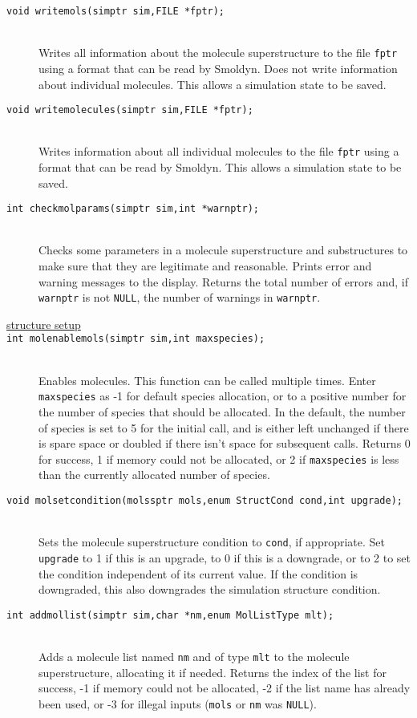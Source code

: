 \documentclass {scrbook}
\newcommand {\ttt} {\texttt}
\begin{document}
\begin{description}
\item[\ttt{void writemols(simptr sim,FILE *fptr);}]
\hfill \\
Writes all information about the molecule superstructure to the file \ttt{fptr} using a format that can be read by Smoldyn. Does not write information about individual molecules. This allows a simulation state to be saved.

\item[\ttt{void writemolecules(simptr sim,FILE *fptr);}]
\hfill \\
Writes information about all individual molecules to the file \ttt{fptr} using a format that can be read by Smoldyn. This allows a simulation state to be saved.

\item[\ttt{int checkmolparams(simptr sim,int *warnptr);}]
\hfill \\
Checks some parameters in a molecule superstructure and substructures to make sure that they are legitimate and reasonable. Prints error and warning messages to the display. Returns the total number of errors and, if \ttt{warnptr} is not \ttt{NULL}, the number of warnings in \ttt{warnptr}.

\item[\underline{structure setup}]

\item[\ttt{int molenablemols(simptr sim,int maxspecies);}]
\hfill \\
Enables molecules. This function can be called multiple times. Enter \ttt{maxspecies} as -1 for default species allocation, or to a positive number for the number of species that should be allocated. In the default, the number of species is set to 5 for the initial call, and is either left unchanged if there is spare space or doubled if there isn't space for subsequent calls. Returns 0 for success, 1 if memory could not be allocated, or 2 if \ttt{maxspecies} is less than the currently allocated number of species.

\item[\ttt{void molsetcondition(molssptr mols,enum StructCond cond,int upgrade);}]
\hfill \\
Sets the molecule superstructure condition to \ttt{cond}, if appropriate. Set \ttt{upgrade} to 1 if this is an upgrade, to 0 if this is a downgrade, or to 2 to set the condition independent of its current value. If the condition is downgraded, this also downgrades the simulation structure condition.

\item[\ttt{int addmollist(simptr sim,char *nm,enum MolListType mlt);}]
\hfill \\
Adds a molecule list named \ttt{nm} and of type \ttt{mlt} to the molecule superstructure, allocating it if needed. Returns the index of the list for success, -1 if memory could not be allocated, -2 if the list name has already been used, or -3 for illegal inputs (\ttt{mols} or \ttt{nm} was \ttt{NULL}).


\end{description}
\end{document}

